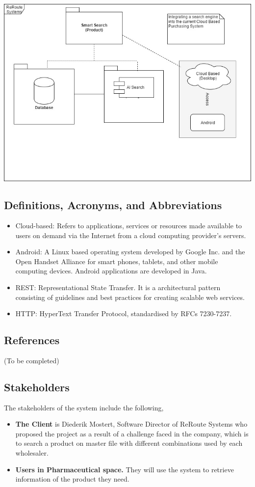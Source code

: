 \documentclass[a4paper,10pt]{article}
\begin{document}
	\includegraphics[scale=0.60]{scope1.jpg}
	\subsection{Definitions, Acronyms, and Abbreviations} 

	\begin{itemize} 
	\item Cloud-based: Refers to applications, services or resources made available to users on demand via the Internet from a cloud computing provider's servers.
	\item Android: A Linux based operating system developed by Google Inc. and the Open Handset Alliance for smart phones, tablets, and other mobile computing devices. Android applications are developed in Java.
	\item REST: Representational State Transfer. It is a architectural pattern consisting of guidelines and best practices
for creating scalable web services.
	\item HTTP: HyperText Transfer Protocol, standardised by RFCs 7230-7237.
	\end{itemize}
	
	\subsection{References} 
	(To be completed)
	
	\subsection{Stakeholders}
	The stakeholders of the system include the following,
	\begin{itemize}
	\item \textbf{The Client} is Diederik Mostert, Software Director of ReRoute Systems who proposed the project as a result of a challenge faced in the company, which is to search a product on master file with different combinations used by each wholesaler.
	\item \textbf{Users in Pharmaceutical space.} They will use the system to retrieve information of the product they need.
	\end{itemize}
\end{document}
